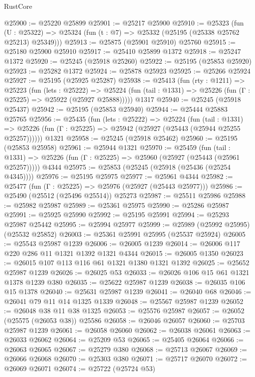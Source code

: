 \begin{lexlean}{RustCore}
\begin{coremodule}
@25900 := @25220 @25899
@25901 := @25217 @25900
@25910 := @25323
    (fun (U : @25322) => @25324 (fun (t : @7) => @25332 (@25195 (@25338 @25762 @25213) @25349)))
@25913 := @25875 (@25901 @25910) @25760
@25915 := @25180 @25900 @25910
@25917 := @25410 @25899 @1372
@25918 := @25247 @1372
@25920 := @25245 (@25918 @25260)
@25922 := @25195 (@25853 @25920)
@25923 := @25282 @1372
@25924 := @25878 @25923
@25925 := @25266 @25924
@25927 := @25195 (@25925 @25287)
@25938 := @25413
    (fun (rty : @1211) =>
    @25223
      (fun (lets : @25222) =>
      @25224 (fun (tail : @1331) => @25226 (fun (Γ : @25225) => @25922 (@25927 @25888)))))
    @1317
@25940 := @25245 (@25918 @25437)
@25942 := @25195 (@25853 @25940)
@25944 := @25444 @25883 @25765
@25956 := @25435
    (fun (lets : @25222) =>
    @25224
      (fun (tail : @1331) =>
      @25226 (fun (Γ : @25225) => @25942 (@25927 (@25443 (@25944 @25255 @25257))))))
    @1321
@25958 := @25245 (@25918 @25462)
@25960 := @25195 (@25853 @25958)
@25961 := @25944 @1321
@25970 := @25459
    (fun (tail : @1331) => @25226 (fun (Γ : @25225) => @25960 (@25927 (@25443 (@25961 @25257)))))
    @4344
@25975 := @25853 (@25245 (@25918 (@25436 (@25254 @4345))))
@25976 := @25195 @25975
@25977 := @25961 @4344
@25982 := @25477 (fun (Γ : @25225) => @25976 (@25927 (@25443 @25977)))
@25986 := @25490 (@25512 (@25496 @25514)) @25273
@25987 := @25511 @25986
@25988 := @25982 @25987
@25989 := @25361 @25975
@25990 := @25286 @25987
@25991 := @25925 @25990
@25992 := @25195 @25991
@25994 := @25293 @25987 @25442
@25995 := @25994 @25977
@25999 := @25989 (@25992 @25995) (@25532 @25852)
@26003 := @25361 @25991 @25995 (@25537 @25924)
@26005 := @25543 @25987 @1239
@26006 := @26005 @1239
@26014 := @26006 @117 @220 @286 @11 @1321 @1392 @1321 @4344
@26015 := @26005 @1350
@26023 := @26015 @107 @113 @116 @61 @1321 @1380 @1321 @1392
@26025 := @25652 @25987 @1239
@26026 := @26025 @53
@26033 := @26026 @106 @15 @61 @1321 @1378 @1239 @380
@26035 := @25622 @25987 @1239
@26038 := @26035 @106 @15 @1378
@26040 := @25631 @25987 @1239
@26041 := @26040 @68
@26046 := @26041 @79 @11 @14 @1325 @1339
@26048 := @25567 @25987 @1239
@26052 := @26048 @38 @11 @38 @1325
@26053 := @25576 @25987
@26057 := @26052 (@25575 (@26053 @38)) @25586
@26058 := @26046 @26057
@26060 := @25703 @25987 @1239
@26061 := @26058 @26060
@26062 := @26038 @26061
@26063 := @26033 @26062
@26064 := @25209 @53
@26065 := @25405 @26064
@26066 := @26063 @26065
@26067 := @25279 @380
@26068 := @25713 @26067
@26069 := @26066 @26068
@26070 := @25303 @380
@26071 := @25717 @26070
@26072 := @26069 @26071
@26074 := @25722 (@25724 @53)

\end{coremodule}
\end{lexlean}
